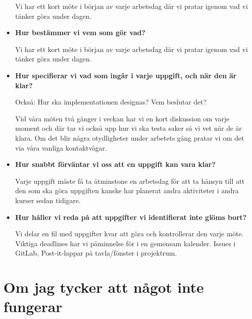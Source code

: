 \documentclass{mall}
\begin{document}
\begin{itemize}
  Vi har ett kort möte i början av varje arbetsdag där vi pratar igenom vad vi tänker göra under dagen.

\item \textbf{Hur bestämmer vi vem som gör vad?}

  Vi har ett kort möte i början av varje arbetsdag där vi pratar igenom vad vi tänker göra under dagen.

\item \textbf{Hur specifierar vi vad som ingår i varje uppgift, och när den är klar?}

  Också: Hur ska implementationen designas? Vem beslutar det?

  Vid våra möten två gånger i veckan har vi en kort diskussion om varje moment och där tar vi också
  upp hur vi ska testa saker så vi vet när de är klara. Om det blir några otydligheter under arbetets
  gång pratar vi om det via våra vanliga kontaktvägar.

\item \textbf{Hur snabbt förväntar vi oss att en uppgift kan vara klar?}

  Varje uppgift måste få ta åtminstone en arbetsdag för att ta hänsyn till att den som ska göra
  uppgiften kanske har planerat andra aktiviteter i andra kurser sedan tidigare.

\item \textbf{Hur håller vi reda på att uppgifter vi identifierat inte glöms bort?}

  Vi delar en fil med uppgifter kvar att göra och kontrollerar den varje möte. Viktiga deadlines har
  vi påminnelse för i en gemensam kalender. Issues i GitLab, Post-it-lappar på tavla/fönster i
  projektrum.

\end{itemize}

\section{Om jag tycker att något inte fungerar}
\end{document}

